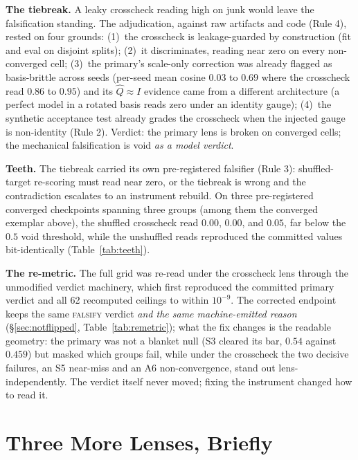 \documentclass{article}
\begin{document}
 \textbf{The tiebreak.} A leaky crosscheck reading high on junk would
leave the falsification standing. The adjudication, against raw
artifacts and code
(Rule 4), rested on four grounds:
(1)~the crosscheck is leakage-guarded by construction (fit and eval
on disjoint splits); (2)~it
discriminates, reading near zero on every non-converged
cell; (3)~the primary's scale-only correction was already flagged as
basis-brittle across seeds (per-seed mean cosine $0.03$ to $0.69$
where the crosscheck read $0.86$ to $0.95$) and its
$\hat{Q}\approx I$ evidence came from a different architecture (a
perfect model in a rotated basis reads zero under an identity gauge);
(4)~the synthetic acceptance test already grades the crosscheck when
the injected gauge is non-identity (Rule 2).
Verdict: the primary lens is broken on converged cells; the mechanical
falsification is void \emph{as a model verdict}.

 \textbf{Teeth.} The tiebreak carried its own pre-registered falsifier
(Rule 3): shuffled-target re-scoring must read near zero, or the
tiebreak is wrong and the contradiction escalates to an instrument
rebuild. On three pre-registered converged checkpoints spanning
three groups (among them the converged exemplar above), the shuffled
crosscheck read $0.00$, $0.00$, and
$0.05$, far below the $0.5$ void threshold, while the unshuffled
reads reproduced the committed values bit-identically
(Table~\ref{tab:teeth}).

\textbf{The re-metric.} The full grid was re-read under the crosscheck
lens through the unmodified verdict machinery, which first reproduced
the committed primary verdict and all 62 recomputed ceilings to within
$10^{-9}$.
The corrected endpoint keeps the same \textsc{falsify} verdict
\emph{and the same machine-emitted reason}
(\S\ref{sec:notflipped}, Table~\ref{tab:remetric}); what the fix
changes is the readable geometry: the primary was not a blanket
null (S3 cleared its bar, $0.54$ against $0.459$) but masked which
groups fail, while under the crosscheck the two decisive
failures, an S5 near-miss and an A6 non-convergence, stand out
lens-independently. The verdict itself never moved; fixing the
instrument changed how to read it.

\section{Three More Lenses, Briefly}
\label{sec:threelenses}
\end{document}
